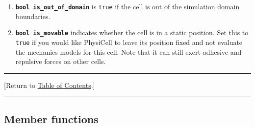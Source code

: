 \documentclass[12pt]{article}
\renewcommand{\v}{\verb}
\newcommand{\smallcode}[1]{\textbf{\texttt{#1}}}
\newcommand{\TOClink}{\begin{center}\hrule\vskip-10pt\phantom{.}\hfill[Return to \hyperlink{TOC}{Table of Contents}.]\hfill\phantom{.}\vskip3pt\hrule\end{center}}
\begin{document}
\begin{enumerate} 
\item 
\smallcode{bool is\_out\_of\_domain} is \v|true| if the cell is out 
of the simulation domain boundaries. 

\item 
\smallcode{bool is\_movable} indicates whether the cell is in a 
static position. Set this to \v|true| if you would like 
PhysiCell to leave its position fixed and not evaluate the 
mechanics models for this cell. Note that it can still 
exert adhesive and repulsive forces on other cells. 
\end{enumerate}

\TOClink

\subsection{Member functions}
\label{sec:cell_member_functions}
\end{document}
